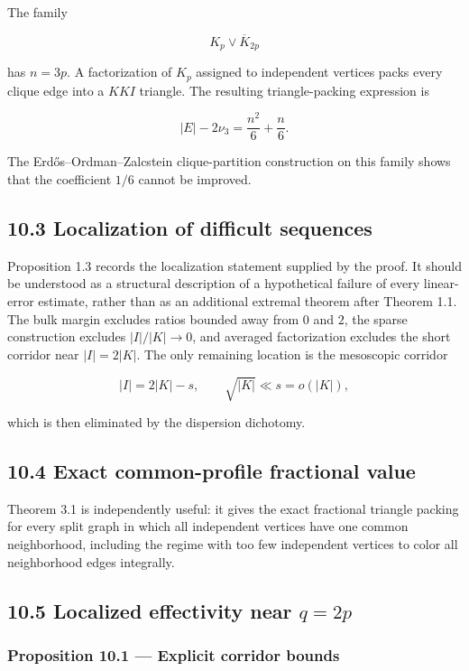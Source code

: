 \documentclass[11pt,a4paper]{article}
\begin{document}
The family

\[
K_p\vee\overline K_{2p}
\]

has \(n=3p\). A factorization of \(K_p\) assigned to independent vertices packs every clique edge into a \(KKI\) triangle. The resulting triangle-packing expression is

\[
|E|-2\nu_3
=
\frac{n^2}{6}+\frac n6.
\tag{10.1}
\]

The Erdős--Ordman--Zalcstein clique-partition construction on this family shows that the coefficient \(1/6\) cannot be improved.

\subsection{10.3 Localization of difficult sequences}\label{localization-of-difficult-sequences}

Proposition 1.3 records the localization statement supplied by the proof. It should be understood as a structural description of a hypothetical failure of every linear-error estimate, rather than as an additional extremal theorem after Theorem 1.1. The bulk margin excludes ratios bounded away from \(0\) and \(2\), the sparse construction excludes \(|I|/|K|\to0\), and averaged factorization excludes the short corridor near \(|I|=2|K|\). The only remaining location is the mesoscopic corridor

\[
|I|=2|K|-s,
\qquad
\sqrt{|K|}\ll s=o(|K|),
\]

which is then eliminated by the dispersion dichotomy.

\subsection{10.4 Exact common-profile fractional value}\label{exact-common-profile-fractional-value}

Theorem 3.1 is independently useful: it gives the exact fractional triangle packing for every split graph in which all independent vertices have one common neighborhood, including the regime with too few independent vertices to color all neighborhood edges integrally.

\subsection{\texorpdfstring{10.5 Localized effectivity near \(q=2p\)}{10.5 Localized effectivity near q=2p}}\label{localized-effectivity-near-q2p}

\subsubsection{Proposition 10.1 --- Explicit corridor bounds}\label{proposition-10.1-explicit-corridor-bounds}
\end{document}
